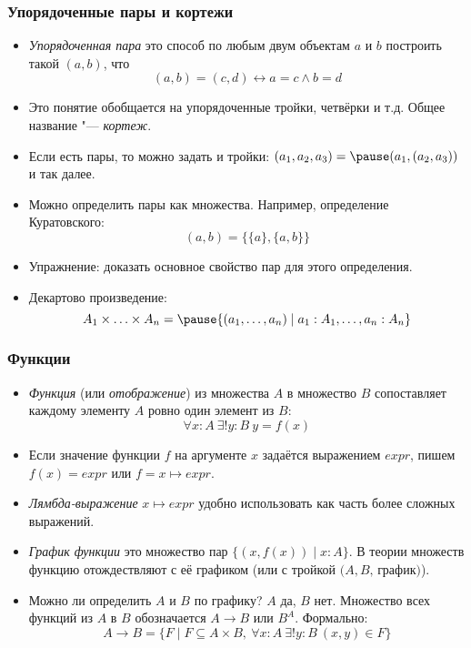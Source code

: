 \documentclass[10pt]{beamer}
\begin{document}
\begin{frame}
    \frametitle{Упорядоченные пары и кортежи}
    \begin{itemize}
        \item \emph{Упорядоченная пара} это способ по любым двум объектам $a$ и $b$ построить такой $(a,b)$, что \pause
        $$(a,b) = (c,d) \leftrightarrow a = c \land b = d$$
        \item Это понятие обобщается на упорядоченные тройки, четвёрки и т.д. Общее название "--- \emph{кортеж}.
        \item Если есть пары, то можно задать и тройки: $(a_1, a_2, a_3) = \pause (a_1, (a_2, a_3))$ и так далее.
        \item Можно определить пары как множества. Например, определение Куратовского: $$(a, b) = \{\{a\}, \{a, b\}\}$$
        \item Упражнение: доказать основное свойство пар для этого определения.
        \item Декартово произведение: $$A_1 \times \ldots \times A_n = \pause \{(a_1, \ldots, a_n) \mid a_1 : A_1, \ldots, a_n : A_n\}$$
    \end{itemize}
\end{frame}

\begin{frame}
    \frametitle{Функции}
    \begin{itemize}
        \item \emph{Функция} (или \emph{отображение}) из множества $A$ в множество $B$ сопоставляет каждому элементу $A$ ровно один элемент из $B$:
        $$\forall x : A ~ \exists ! y : B ~ y=f(x)$$
        \pause
        \vspace{-2ex}
        \item Если значение функции $f$ на аргументе $x$ задаётся выражением $expr$, пишем $f(x) = expr$ или $f = x \mapsto expr$. 
        \item \emph{Лямбда-выражение} $x \mapsto expr$ удобно использовать как часть более сложных выражений.
        \pause
        \item \emph{График функции} это множество пар $\{(x, f(x)) \mid x : A\}$. В теории множеств функцию отождествляют с её графиком (или с тройкой $(A,B,$\,график$)$).
        \item Можно ли определить $A$ и $B$ по графику? \pause $A$ да, $B$ нет.
        \pause
        Множество всех функций из $A$ в $B$ обозначается $A \to B$ или $B^A$. Формально:
        $$A \to B = \{F \mid F \subseteq A \times B, ~ \forall x : A ~ \exists ! y : B ~ (x,y) \in F\}$$
    \end{itemize}
\end{frame}
\end{document}
